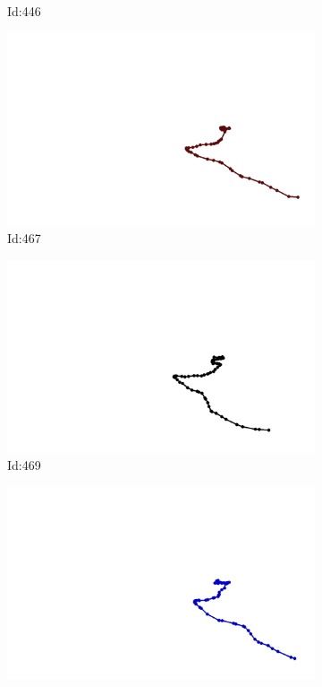 \documentclass[12pt,twoside]{report}
\begin{document}
\begin{figure}
\begin{subfigure}[b]{0.20\textwidth}
\caption{Id:446}
\end{subfigure}
\begin{subfigure}[b]{0.20\textwidth}
\centering
\includegraphics[width=\textwidth]{../trajectories/467.png}
\caption{Id:467}
\end{subfigure}
\begin{subfigure}[b]{0.20\textwidth}
\centering
\includegraphics[width=\textwidth]{../trajectories/469.png}
\caption{Id:469}
\end{subfigure}
\begin{subfigure}[b]{0.20\textwidth}
\centering
\includegraphics[width=\textwidth]{../trajectories/487.png}

\end{subfigure}
\end{figure}
\end{document}
